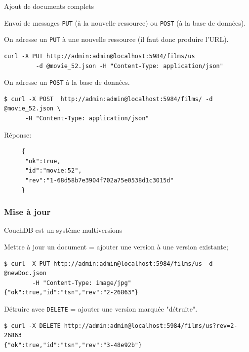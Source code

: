 \begin{frame}[fragile]{Ajout de documents complets}

Envoi de messages \texttt{PUT} 
(à la nouvelle ressource) ou \texttt{POST} (à la base
de données).

\vfill

On adresse un \texttt{PUT} à une \alert{nouvelle} ressource
(il faut donc produire l'URL).

\begin{verbatim}
curl -X PUT http://admin:admin@localhost:5984/films/us 
         -d @movie_52.json -H "Content-Type: application/json" 
\end{verbatim}



\vfill

On adresse un \texttt{POST} à la base de données.

\begin{verbatim}
$ curl -X POST  http://admin:admin@localhost:5984/films/ -d @movie_52.json \
      -H "Content-Type: application/json"
\end{verbatim}

Réponse: 

\begin{verbatim}
     {
      "ok":true,
      "id":"movie:52",
      "rev":"1-68d58b7e3904f702a75e0538d1c3015d"
     }
\end{verbatim}


\end{frame}


\begin{frame}[fragile]
\frametitle{Mise à jour}

CouchDB est un système \alert{multiversions}

\vfill

Mettre à jour un document = ajouter une version à une version existante;


\begin{verbatim}
$ curl -X PUT http://admin:admin@localhost:5984/films/us -d @newDoc.json 
        -H "Content-Type: image/jpg" 
{"ok":true,"id":"tsn","rev":"2-26863"}
\end{verbatim}

\vfill
Détruire avec \texttt{DELETE} = ajouter une version marquée "détruite".

\begin{verbatim}
$ curl -X DELETE http://admin:admin@localhost:5984/films/us?rev=2-26863
{"ok":true,"id":"tsn","rev":"3-48e92b"}
\end{verbatim}

\end{frame}


